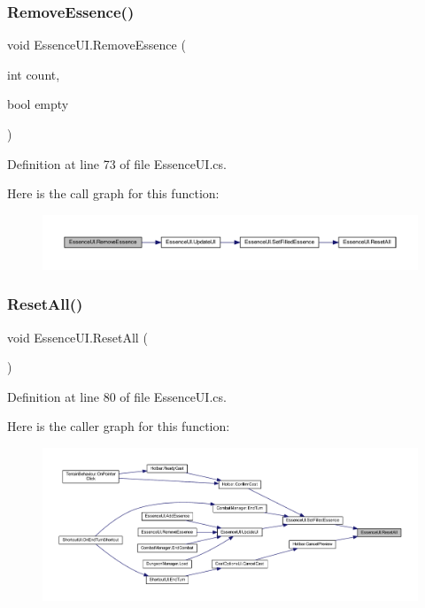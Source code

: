 \subsubsection{\texorpdfstring{RemoveEssence()}{RemoveEssence()}}
{\footnotesize\ttfamily void Essence\+U\+I.\+Remove\+Essence (\begin{DoxyParamCaption}\item[{int}]{count,  }\item[{bool}]{empty }\end{DoxyParamCaption})}



Definition at line 73 of file Essence\+U\+I.\+cs.

Here is the call graph for this function\+:
\nopagebreak
\begin{figure}[H]
\begin{center}
\leavevmode
\includegraphics[width=350pt]{class_essence_u_i_a39b3c1ec97a29130e2e8ab4050921ed6_cgraph}
\end{center}
\end{figure}
\mbox{\label{class_essence_u_i_a82a6c20070b4fd052eae20ba6e05487b}} 
\subsubsection{\texorpdfstring{ResetAll()}{ResetAll()}}
{\footnotesize\ttfamily void Essence\+U\+I.\+Reset\+All (\begin{DoxyParamCaption}{ }\end{DoxyParamCaption})}



Definition at line 80 of file Essence\+U\+I.\+cs.

Here is the caller graph for this function\+:
\nopagebreak
\begin{figure}[H]
\begin{center}
\leavevmode
\includegraphics[width=350pt]{class_essence_u_i_a82a6c20070b4fd052eae20ba6e05487b_icgraph}
\end{center}
\end{figure}
\mbox{\label{class_essence_u_i_aac12f1c82310ceb94e259d9b6aa9bdfd}} 
